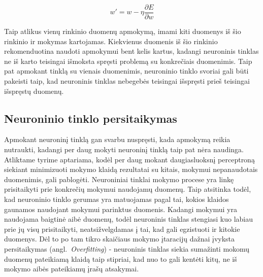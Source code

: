 \documentclass{VUMIFPSbakalaurinis}
\begin{document}
\begin{equation}\label{eq:learning}
w' = w - \eta\frac{\partial E}{\partial w}
\end{equation}

Taip atlikus vienų rinkinio duomenų apmokymą, imami kiti duomenys iš šio rinkinio ir mokymas kartojamas.
Kiekvienus duomenis iš šio rinkinio rekomenduotina naudoti apmokymui bent kelis kartus, kadangi neuroninis tinklas ne iš karto teisingai išmoksta spręsti problemą su konkrečiais duomenimis.
Taip pat apmokant tinklą su vienais duomenimis, neuroninio tinklo svoriai gali būti pakeisti taip, kad neuroninis tinklas nebegebės teisingai išspręsti prieš teisingai išspręstų duomenų.





\subsection{Neuroninio tinklo persitaikymas}


Apmokant neuroninį tinklą gan svarbu nuspręsti, kada apmokymą reikia nutraukti, kadangi per daug mokyti neuroninį tinklą taip pat nėra naudinga.
Atliktame tyrime \cite[114~psl.]{overfitting} aptariama, kodėl per daug mokant daugiasluoksnį perceptroną siekiant minimizuoti mokymo klaidą rezultatai su kitais, mokymui nepanaudotais duomenimis, gali pablogėti.
Neuroniniai tinklai mokymo procese yra linkę prisitaikyti prie konkrečių mokymui naudojamų duomenų.
Taip atsitinka todėl, kad neuroninio tinklo gerumas yra matuojamas pagal tai, kokios klaidos gaunamos naudojant mokymui parinktus duomenis.
Kadangi mokymui yra naudojama baigtinė aibė duomenų, todėl neuroninis tinklas stengiasi kuo labiau prie jų visų prisitaikyti, neatsižvelgdamas į tai, kad gali egzistuoti ir kitokie duomenys.
Dėl to po tam tikro skaičiaus mokymo įtaracijų dažnai įvyksta persitaikymas (angl.~\textit{Overfitting}) - neuroninis tinklas siekia sumažinti mokomų duomenų pateikiamą klaidą taip stipriai, kad nuo to gali kentėti kitų, ne iš mokymo aibės pateikiamų įrašų atsakymai.
\end{document}
